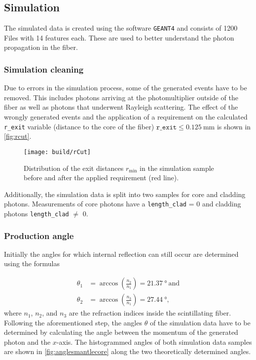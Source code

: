 \subsection{Simulation}

The simulated data is created using the software \texttt{GEANT4} and consists of 1200 Files with 14 features each. 
These are used to better understand the photon propagation in the fiber. 
\subsubsection{Simulation cleaning}
Due to errors in the simulation process, some of the generated events have to be removed. 
This includes photons arriving at the photomultiplier outside of the fiber as well as photons that underwent Rayleigh scattering. 
The effect of the wrongly generated events and the application of a requirement on the calculated \texttt{r\_exit} variable 
(distance to the core of the fiber) $\mathtt{r\_exit}\leq \qty{0.125}{\milli\meter}$ is shown in \autoref{fig:rcut}.

\begin{figure}[H]
	\centering
	\texttt{[image: build/rCut]}
	\caption{Distribution of the exit distances $r_\mathrm{min}$ in the simulation sample before and after the applied requirement (red line).}
	\label{fig:rcut}
\end{figure}

Additionally, the simulation data is split into two samples for core and cladding photons. Measurements of core photons have a \texttt{length\_clad} = 0 and cladding photons \texttt{length\_clad} $\neq$ 0.

\subsubsection{Production angle}
Initially the angles for which internal reflection can still occur are determined using the formulas

\begin{align*}
	\theta_1 &= \arccos\left(\frac{n_2}{n_1}\right) = \qty{21.37}{\degree}\ \mathrm{and}\\
	\theta_2 &= \arccos\left(\frac{n_3}{n_1}\right) = \qty{27.44}{\degree},
\end{align*}
where $n_1$, $n_2$, and $n_3$ are the refraction indices inside the scintillating fiber.
Following the aforementioned step, the angles $\theta$ of the simulation data have to be determined by 
calculating the angle between the momentum of the generated photon and the $x$-axis. 
The histogrammed angles of both simulation data samples are shown in \autoref{fig:anglesmantlecore} along the two theoretically determined angles.


